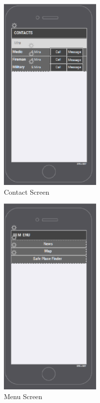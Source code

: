 \begin{figure}[htbp]
\begin{center}
 \caption{\label{fig:A5} Contact Screen}
   \includegraphics[width=50mm]{./images/App/contactscreen.eps}
\end{center}
\end{figure} 
\begin{figure}[htbp]
\begin{center}
 \caption{\label{fig:A3C} Menu Screen}
   \includegraphics[width=50mm]{./images/App/cmenu.eps}
\end{center}
\end{figure} 
